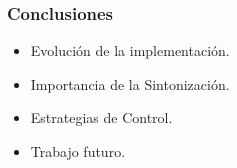 \frame
{
\frametitle{Conclusiones}
\begin{itemize}
	\item Evolución de la implementación.
	\item Importancia de la Sintonización.
	\item Estrategias de Control.
	\item Trabajo futuro. 
\end{itemize}
}

